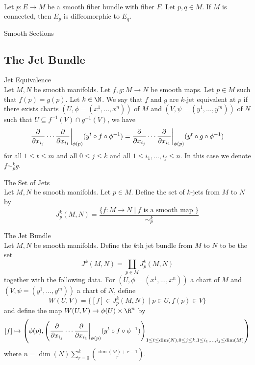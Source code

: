\documentclass[a4paper]{article}
\begin{document}
\begin{lmm}{}{}\\
Let $p:E\to M$ be a smooth fiber bundle with fiber $F$. Let $p,q\in M$. If $M$ is connected, then $E_p$ is diffeomorphic to $E_q$. 
\end{lmm}

\begin{defn}{Smooth Sections}{}
\end{defn}

\subsection{The Jet Bundle}
\begin{defn}{Jet Equivalence}{}\\
Let $M,N$ be smooth manifolds. Let $f,g:M\to N$ be smooth maps. Let $p\in M$ such that $f(p)=g(p)$. Let $k\in\N$. We say that $f$ and $g$ are $k$-jet equivalent at $p$ if there exists charts $(U,\phi=(x^1,\dots,x^n))$ of $M$ and $(V,\psi=(y^1,\dots,y^m))$ of $N$ such that $U\subseteq f^{-1}(V)\cap g^{-1}(V)$, we have $$\frac{\partial}{\partial x_{i_j}}\cdots\frac{\partial}{\partial x_{i_1}}\bigg{|}_{\phi(p)}(y^t\circ f\circ\phi^{-1})=\frac{\partial}{\partial x_{i_j}}\cdots\frac{\partial}{\partial x_{i_1}}\bigg{|}_{\phi(p)}(y^t\circ g\circ\phi^{-1})$$ for all $1\leq t\leq m$ and all $0\leq j\leq k$ and all $1\leq i_1,\dots,i_j\leq n$. In this case we denote $f\sim_p^kg$. 
\end{defn}

\begin{defn}{The Set of Jets}{}\\
Let $M,N$ be smooth manifolds. Let $p\in M$. Define the set of $k$-jets from $M$ to $N$ by $$J_p^k(M,N)=\frac{\{f:M\to N\;|\;f\text{ is a smooth map }\}}{\sim_p^k}$$
\end{defn}

\begin{defn}{The Jet Bundle}{}\\
Let $M,N$ be smooth manifolds. Define the $k$th jet bundle from $M$ to $N$ to be the set $$J^k(M,N)=\coprod_{p\in M}J_p^k(M,N)$$ together with the following data. For $(U,\phi=(x^1,\dots,x^n))$ a chart of $M$ and $(V,\psi=(y^1,\dots,y^m))$ a chart of $N$, define $$W(U,V)=\{[f]\in J_p^k(M,N)\;|\;p\in U,f(p)\in V\}$$ and define the map $W(U,V)\to\phi(U)\times\R^n$ by $$[f]\mapsto\left(\phi(p),\left(\frac{\partial}{\partial x_{i_j}}\cdots\frac{\partial}{\partial x_{i_1}}\bigg{|}_{\phi(p)}(y^t\circ f\circ\phi^{-1})\right)_{1\leq t\leq\dim(N),0\leq j\leq k,1\leq i_1,\dots,i_j\leq\dim(M)}\right)$$ where $n=\dim(N)\sum_{r=0}^k\binom{\dim(M)+r-1}{r}$. 
\end{defn}
\end{document}
